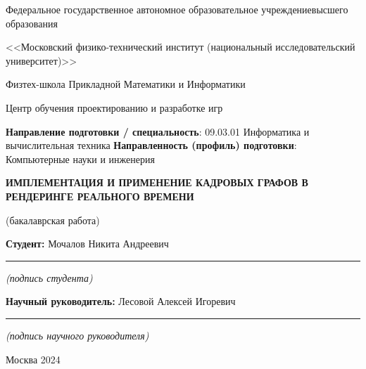 \documentclass[12pt]{extarticle}
\renewcommand*{\maketitle}{
\begin{titlepage}
  \begin{center}
    \linespread{1}
    \small
    Федеральное государственное автономное образовательное учреждение\break высшего образования\par
    <<Московский физико-технический институт \break (национальный исследовательский университет)>>\par
    Физтех-школа Прикладной Математики и Информатики\par
    Центр обучения проектированию и разработке игр\par
  \end{center}
%
  {
    \small
    {\bf Направление подготовки / специальность}: 09.03.01 Информатика и вычислительная техника\newline
    {\bf Направленность (профиль) подготовки}: Компьютерные науки и инженерия
  }
%
  {
    \topskip0pt
    \vspace*{\fill}
    \begin{center}
      {\bf\Large ИМПЛЕМЕНТАЦИЯ И ПРИМЕНЕНИЕ КАДРОВЫХ ГРАФОВ В РЕНДЕРИНГЕ РЕАЛЬНОГО ВРЕМЕНИ}\par(бакалаврская работа)
    \end{center}
    \vspace*{\fill}
  }
%
  \hfill
  \begin{minipage}[t]{8cm}
    {\bf Студент: \newline}
    Мочалов Никита Андреевич\newline
    \vspace{-3mm}
    \rule{8cm}{0.15mm}
    \centerline{\scriptsize\it (подпись студента)}\newline
%
    {\bf Научный руководитель: \newline}
    Лесовой Алексей Игоревич\newline
    \vspace{-3mm}
    \rule{8cm}{0.15mm}
    \centerline{\scriptsize\it (подпись научного руководителя)}
  \end{minipage}

  \vspace*{\fill}
  \begin{center}
    Москва 2024
  \end{center}
\end{titlepage}
}
\begin{document}
\maketitle
\newpage
\setcounter{page}{2}
\vspace*{\fill}
\begin{abstract}

Данная работа посвящена разработке кадрового графа и исследованию его связи со слоем абстракции над графическими API (Render Hardware Interface). Было предложено внедрить данный механизм непосредственно в слой абстракции. В результате работы была написана эффективная имплементация кадрового графа с использованием современного графического API Vulkan. Кроме того, был спроектирован и реализован высокоуровневый рендерер в качестве доказательства практической применимости выбранного дизайна.



\end{abstract}
\vspace*{\fill}
\newpage
\tableofcontents
\newpage

\newpage

\newpage

\newpage

\newpage

\newpage
\printbibliography
\end{document}
